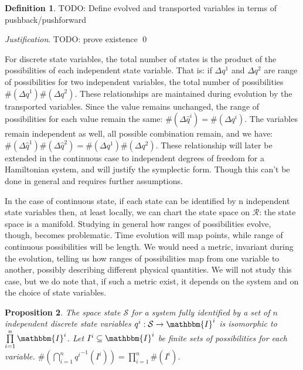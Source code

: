 \documentclass[aps,pra,10pt,twocolumn,floatfix,nofootinbib]{revtex4-1}
\newtheorem{prop}{Proposition}[section]
\theoremstyle{definition}
\newtheorem{defn}[prop]{Definition}
\newenvironment{justification}{\emph{Justification}.}{\qed}
\begin{document}
\begin{defn}\label{evolved_transported_variable}
TODO: Define evolved and transported variables in terms of pushback/pushforward
\end{defn}

\begin{justification}
TODO: prove existence
\end{justification}


For discrete state variables, the total number of states is the product of the possibilities of each independent state variable. That is: if $\Delta q^1$ and $\Delta q^2$ are range of possibilities for two independent variables, the total number of possibilities $\#(\Delta q^1) \#(\Delta q^2)$. These relationships are maintained during evolution by the transported variables. Since the value remains unchanged, the range of possibilities for each value remain the same: $\#(\Delta \hat{q}^i) = \#(\Delta q^i)$. The variables remain independent as well, all possible combination remain, and we have: $\#(\Delta \hat{q}^1) \#(\Delta \hat{q}^2) = \#(\Delta q^1) \#(\Delta q^2)$. These relationship will later be extended in the continuous case to independent degrees of freedom for a Hamiltonian system, and will justify the symplectic form. Though this can't be done in general and requires further assumptions.

In the case of continuous state, if each state can be identified by n independent state variables then, at least locally, we can chart the state space on $\mathcal{R}$: the state space is a manifold. Studying in general how ranges of possibilities evolve, though, becomes problematic. Time evolution will map points, while range of continuous possibilities will be length. We would need a metric, invariant during the evolution, telling us how ranges of possibilities map from one variable to another, possibly describing different physical quantities. We will not study this case, but we do note that, if such a metric exist, it depends on the system and on the choice of state variables.


\begin{prop}\label{discrete_state_space}
The space state $\mathcal{S}$ for a system fully identified by a set of $n$ independent discrete state variables $q^i : \mathcal{S} \rightarrow \mathbbm{I}^i$ is isomorphic to $\prod\limits_{i=1}^n\mathbbm{I}^i$. Let $I^i \subseteq \mathbbm{I}^i$ be finite sets of possibilities for each variable. $\#(\bigcap\limits_{i=1}^{n}{q^i}^{-1}(I^i))=\prod\limits_{i=1}^{n}\#(I^i)$.
\end{prop}
\end{document}
